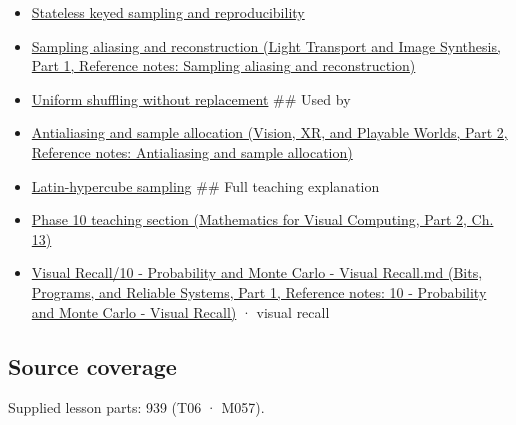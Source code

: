 \hypertarget{appendix-9f693ffd82bc-prerequisites}{}

\begin{itemize}
\item
  \hyperref[appendix-daaf25bfd3a0]{Stateless keyed sampling and reproducibility}
\item
  \href{../04-Light-Transport-and-Image-Synthesis-P01/main.pdf\#nameddest=appendix-6a7869dd79a6}{Sampling aliasing and reconstruction (Light Transport and Image Synthesis, Part 1, Reference notes: Sampling aliasing and reconstruction)}
\item
  \hyperref[appendix-184fcc411663]{Uniform shuffling without replacement} \#\# Used by
\item
  \href{../07-Vision-XR-and-Playable-Worlds-P02/main.pdf\#nameddest=appendix-4192b2bdd21e}{Antialiasing and sample allocation (Vision, XR, and Playable Worlds, Part 2, Reference notes: Antialiasing and sample allocation)}
\item
  \hyperref[appendix-1c5e85693a06]{Latin-hypercube sampling} \#\# Full teaching explanation
\item
  \href{../02-Mathematics-for-Visual-Computing-P02/main.pdf\#nameddest=02-foundations-ii-ch029-a-computer-produces-deterministic-pseudorandom-sequences}{Phase 10 teaching section (Mathematics for Visual Computing, Part 2, Ch. 13)}
\item
  \href{../01-Bits-Programs-and-Reliable-Systems-P01/main.pdf\#nameddest=appendix-cb5af353ef77}{Visual Recall/10 - Probability and Monte Carlo - Visual Recall.md (Bits, Programs, and Reliable Systems, Part 1, Reference notes: 10 - Probability and Monte Carlo - Visual Recall)} · visual recall
\end{itemize}

\subsection{Source coverage}\label{appendix-9f693ffd82bc-source-coverage}

\hypertarget{appendix-9f693ffd82bc-source-coverage}{}

Supplied lesson parts: 939 (T06 · M057).
